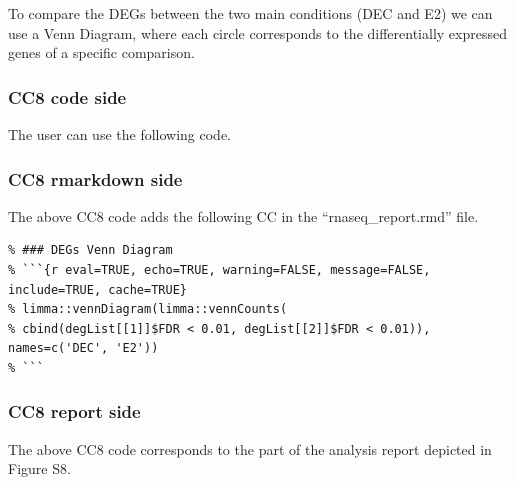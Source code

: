 \documentclass[]{article}
\newenvironment{Shaded}{\begin{snugshade}}{\end{snugshade}}
\newcommand{\CharTok}[1]{\textcolor[rgb]{0.31,0.60,0.02}{#1}}
\newcommand{\DataTypeTok}[1]{\textcolor[rgb]{0.13,0.29,0.53}{#1}}
\newcommand{\DecValTok}[1]{\textcolor[rgb]{0.00,0.00,0.81}{#1}}
\newcommand{\KeywordTok}[1]{\textcolor[rgb]{0.13,0.29,0.53}{\textbf{#1}}}
\newcommand{\NormalTok}[1]{#1}
\newcommand{\StringTok}[1]{\textcolor[rgb]{0.31,0.60,0.02}{#1}}
\begin{document}
To compare the DEGs between the two main conditions (DEC and E2) we can
use a Venn Diagram, where each circle corresponds to the differentially
expressed genes of a specific comparison.

\hypertarget{cc8-code-side}{%
\subsubsection{CC8 code side}\label{cc8-code-side}}

The user can use the following code.

\begin{Shaded}
\end{Shaded}

\hypertarget{cc8-rmarkdown-side}{%
\subsubsection{CC8 rmarkdown side}\label{cc8-rmarkdown-side}}

The above CC8 code adds the following CC in the ``rnaseq\_report.rmd''
file.

\begin{verbatim}
% ### DEGs Venn Diagram
% ```{r eval=TRUE, echo=TRUE, warning=FALSE, message=FALSE, include=TRUE, cache=TRUE}
% limma::vennDiagram(limma::vennCounts(
% cbind(degList[[1]]$FDR < 0.01, degList[[2]]$FDR < 0.01)), names=c('DEC', 'E2'))
% ```
\end{verbatim}

\hypertarget{cc8-report-side}{%
\subsubsection{CC8 report side}\label{cc8-report-side}}

The above CC8 code corresponds to the part of the analysis report
depicted in Figure S8.
\end{document}
